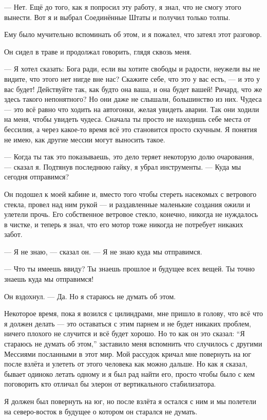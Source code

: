 --- Нет. Ещё до того, как я попросил эту работу, я знал, что не смогу этого вынести. Вот я и выбрал Соединённые Штаты и получил только толпы.

Ему было мучительно вспоминать об этом, и я пожалел, что затеял этот разговор.

Он сидел в траве и продолжал говорить, глядя сквозь меня.

--- Я хотел сказать: Бога ради, если вы хотите свободы и радости, неужели вы не видите, что этого
нет нигде вне нас? Скажите себе, что это у вас есть, --- и это у вас будет! Действуйте так, как
будто она ваша, и она будет вашей! Ричард, что же здесь такого непонятного? Но они даже не
слышали, большинство из них. Чудеса --- это всё равно что ходить на автогонки, желая увидеть
аварии. Так они ходили на меня, чтобы увидеть чудеса. Сначала ты просто не находишь себе места от
бессилия, а через какое-то время всё это становится просто скучным. Я понятия не имею, как другие
мессии могут выносить такое.

--- Когда ты так это показываешь, это дело теряет некоторую долю очарования, --- сказал я.
Подтянув последнюю гайку, я убрал инструменты. --- Куда мы сегодня отправимся?

Он подошел к моей кабине и, вместо того чтобы стереть насекомых с ветрового стекла, провел над
ним рукой --- и раздавленные маленькие создания ожили и улетели прочь. Его собственное ветровое
стекло, конечно, никогда не нуждалось в чистке, и теперь я знал, что его мотор тоже никогда не
потребует никаких забот.

--- Я не знаю, --- сказал он. --- Я не знаю куда мы отправимся.

--- Что ты имеешь ввиду? Ты знаешь прошлое и будущее всех вещей.
Ты точно знаешь куда мы отправимся!

Он вздохнул. --- Да. Но я стараюсь не думать об этом.

Некоторое время, пока я возился с цилиндрами, мне пришло в голову, что всё что я должен делать ---
это оставаться с этим парнем и не будет никаких проблем, ничего плохого не случится и всё
будет хорошо. Но то как он это сказал: ``Я стараюсь не думать об этом,'' заставило меня
вспомнить что случилось с другими Мессиями посланными в этот мир. Мой рассудок кричал мне
повернуть на юг после взлёта и улететь от этого человека как можно дальше. Но как я сказал,
бывает одиноко летать одному и я был рад найти его, просто чтобы было с кем поговорить кто
отличал бы элерон от вертикального стабилизатора.

Я должен был повернуть на юг, но после взлёта я остался с ним и мы полетели на северо-восток
в будущее о котором он старался не думать.

\bye
